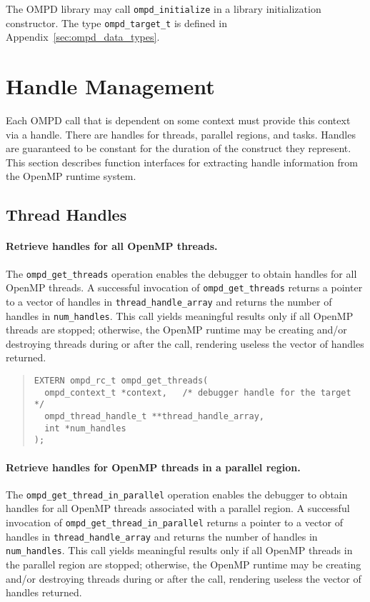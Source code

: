 \documentclass{article}
\begin{document}
\noindent
The OMPD library may call \verb|ompd_initialize| in a library initialization constructor.
The type \verb|ompd_target_t| is defined in Appendix~\ref{sec:ompd_data_types}. 


\section{Handle Management}

Each OMPD call that is dependent on some context must provide this
context via a handle. There are handles for threads, parallel
regions, and tasks. Handles are guaranteed to be constant for the
duration of the construct they represent.
This section describes function interfaces for extracting handle information from the OpenMP runtime system.

\subsection{Thread Handles}


\paragraph{Retrieve handles for all OpenMP threads.}  The  \verb|ompd_get_threads| operation enables the debugger to obtain handles for all OpenMP threads.  A successful invocation of  \verb|ompd_get_threads| returns a pointer to a vector of handles in \verb|thread_handle_array| and returns the number of handles in \verb|num_handles|.
This call yields meaningful results only if all OpenMP threads are stopped; otherwise, the OpenMP runtime may be creating and/or destroying threads during or after the call, rendering useless the vector of handles returned.


\begin{quote}
\begin{verbatim}
EXTERN ompd_rc_t ompd_get_threads(
  ompd_context_t *context,   /* debugger handle for the target */
  ompd_thread_handle_t **thread_handle_array, 
  int *num_handles
);
\end{verbatim}
\end{quote}

\paragraph{Retrieve handles for OpenMP threads in a parallel region.}
The  \verb|ompd_get_thread_in_parallel| operation enables the debugger to obtain handles for all OpenMP threads associated with a parallel region.  A successful invocation of  \verb|ompd_get_thread_in_parallel| returns a pointer to a vector of handles in \verb|thread_handle_array| and returns the number of handles in \verb|num_handles|.
This call yields meaningful results only if all OpenMP threads in the parallel region are stopped; otherwise, the OpenMP runtime may be creating and/or destroying threads during or after the call, rendering useless the vector of handles returned.
\end{document}
